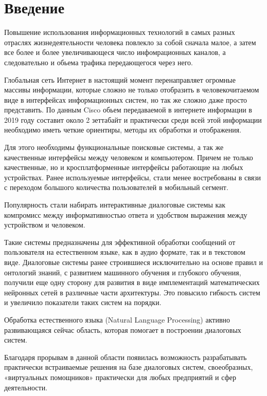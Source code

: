 \chapter*{Введение}
Повышение использования информационных технологий в самых разных отраслях жизнедеятельности человека повлекло за собой сначала малое, а затем все более и более увеличивающеся число инфомрационных каналов, а следовательно и обьема трафика передающегося через него.  

Глобальная сеть Интернет в настоящий момент перенаправляет огромные массивы информации, которые сложно не только отобразить в человекочитаемом виде в интерфейсах информационных систем, но так же сложно даже просто представить. 
По данным Cisco обьем передаваемой в интернете информации в 2019 году составит около 2 зеттабайт \cite{cisco2018cisco} и практически среди всей этой информации необходимо иметь четкие ориентиры, методы их обработки и отображения. 

Для этого необходимы функциональные поисковые системы, а так же качественные интерфейсы между человеком и компьютером. Причем не только качественные, но и кросплатформенные интерфейсы работающие на любых устройствах. Ранее используемые интерфейсы, стали менее востребованы в связи с переходом большого количества пользователей в мобильный сегмент. 

Популярность стали набирать интерактивные диалоговые системы как компромисс  между информативностью ответа и удобством выражения между устройством и человеком. 

Такие системы предназначены для эффективной обработки сообщений от пользователя на естественном языке, как в аудио формате, так и в текстовом виде. Диалоговые системы ранее строившиеся исключительно на основе правил и онтологий знаний, с развитием машинного обучения и глубокого обучения, получили еще одну сторону для развития в виде имплементаций математических нейронных сетей в различные части архитектуры. Это повысило гибкость систем и увеличило показатели таких систем на порядки. 

Обработка естественного языка (Natural Language Processing) активно развивающаяся сейчас область, которая помогает в построении диалоговых систем.

Благодаря прорывам в данной области появилась возможность разрабатывать практически встраиваемые решения на базе диалоговых систем, своеобразных, «виртуальных помощников» практически для любых предприятий и сфер деятельности. 

